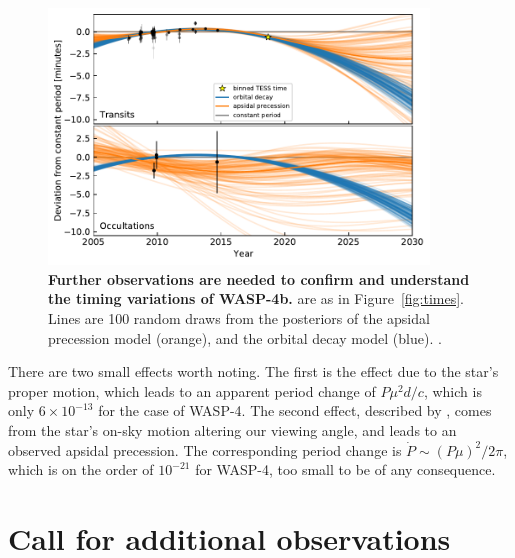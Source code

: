 \documentclass[12pt,twocolumn,tighten]{aastex62}
\begin{document}
\begin{figure}[!ht]
	\begin{center}
		\leavevmode
		\includegraphics[width=0.9\textwidth]{f7.pdf}
	\end{center}
	\vspace{-0.7cm}
	\caption{
    {\bf Further observations are needed to confirm and understand
    the timing variations of WASP-4b.}  are as
    in Figure~\ref{fig:times}.  Lines are 100 random draws from the
    posteriors of the apsidal precession model (orange), and the
    orbital decay model (blue).  .    
		\label{fig:future}
	}
\end{figure}

There are two  small effects worth noting.  The
first is the \citet{shklovskii_possible_1970} effect due to the star's
proper motion, which leads to an apparent period change of $P\mu^2 d/
c$, which is only $6\times10^{-13}$ for the case of WASP-4.  The
second effect, described by \citet{rafikov_stellar_2009}, comes from
the star's on-sky motion altering our viewing angle, and leads to an
observed apsidal precession. The corresponding period change is
$\dot{P} \sim (P\mu)^2/2\pi$, which is on the order of $10^{-21}$ for
WASP-4, too small to be of any consequence.


\section{Call for additional observations}
\label{sec:future}
\end{document}
